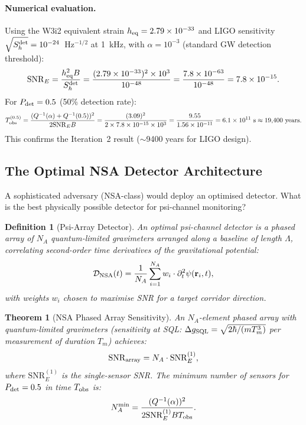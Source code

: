 \documentclass[aps,prd,twocolumn,superscriptaddress,nofootinbib]{revtex4-2}
\newcommand{\SNR}{\mathrm{SNR}}
\newtheorem{theorem}{Theorem}
\newtheorem{definition}{Definition}
\begin{document}
\paragraph{Numerical evaluation.}
Using the W3i2 equivalent strain $h_{\rm eq} = 2.79\times10^{-33}$
and LIGO sensitivity $\sqrt{S_h^{\rm det}} = 10^{-24}$~Hz$^{-1/2}$
at 1~kHz, with $\alpha = 10^{-3}$ (standard GW detection threshold):
\begin{equation}
\SNR_E = \frac{h_{\rm eq}^2 B}{S_h^{\rm det}}
= \frac{(2.79\times10^{-33})^2 \times 10^3}{10^{-48}}
= \frac{7.8\times10^{-63}}{10^{-48}} = 7.8\times10^{-15}.
\end{equation}
For $P_{\rm det} = 0.5$ (50\% detection rate):
\begin{equation}
T_{\rm obs}^{(0.5)} = \frac{(Q^{-1}(\alpha) + Q^{-1}(0.5))^2}{2\SNR_E B}
= \frac{(3.09)^2}{2 \times 7.8\times10^{-15} \times 10^3}
= \frac{9.55}{1.56\times10^{-11}} = 6.1\times10^{11}~\text{s}
\approx 19{,}400~\text{years}.
\end{equation}
This confirms the Iteration~2 result ($\sim$9400 years for LIGO design).

\subsection{The Optimal NSA Detector Architecture}

A sophisticated adversary (NSA-class) would deploy an optimised detector.
What is the best physically possible detector for psi-channel monitoring?

\begin{definition}[Psi-Array Detector]
An optimal psi-channel detector is a phased array of $N_A$ quantum-limited
gravimeters arranged along a baseline of length $\Lambda$, correlating
second-order time derivatives of the gravitational potential:
\begin{equation}
\mathcal{D}_{\rm NSA}(t) = \frac{1}{N_A} \sum_{i=1}^{N_A}
w_i \cdot \partial_t^2\psi(\mathbf{r}_i, t),
\label{eq:NSA-detector}
\end{equation}
with weights $w_i$ chosen to maximise SNR for a target corridor direction.
\end{definition}

\begin{theorem}[NSA Phased Array Sensitivity]
\label{thm:nsa-array}
An $N_A$-element phased array with quantum-limited gravimeters
(sensitivity at SQL: $\Delta g_{\rm SQL} = \sqrt{2\hbar/(m T_m^3)}$ per measurement
of duration $T_m$) achieves:
\begin{equation}
\SNR_{\rm array} = N_A \cdot \SNR_E^{(1)},
\label{eq:SNR-array}
\end{equation}
where $\SNR_E^{(1)}$ is the single-sensor SNR. The minimum number of sensors
for $P_{\rm det} = 0.5$ in time $T_{\rm obs}$ is:
\begin{equation}
N_A^{\rm min} = \frac{(Q^{-1}(\alpha))^2}{2 \SNR_E^{(1)} B T_{\rm obs}}.
\label{eq:NA-min}
\end{equation}
\end{theorem}
\end{document}
